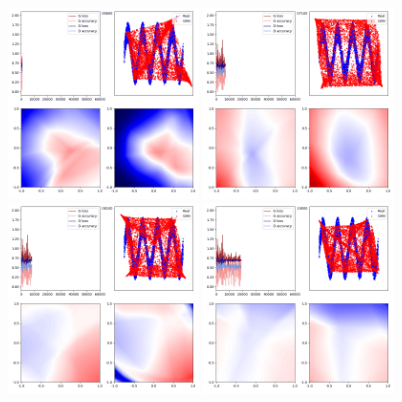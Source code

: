 \documentclass[lang=cn,11pt]{elegantpaper}
\begin{document}
\begin{figure}[hbt]
\centering
  \includegraphics[width=0.45\textwidth]{sin_5_1}
  \includegraphics[width=0.45\textwidth]{sin_5_2}\\
  \includegraphics[width=0.45\textwidth]{sin_5_3}
  \includegraphics[width=0.45\textwidth]{sin_5_4}
  \caption{}
\end{figure}
\end{document}
